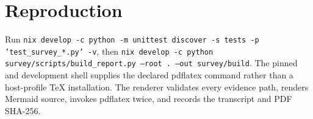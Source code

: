 \documentclass[11pt]{article}
\begin{document}
\section{Reproduction}
Run \texttt{nix develop -c python -m unittest discover -s tests -p 'test\_survey\_*.py' -v}, then \texttt{nix develop -c python survey/scripts/build\_report.py --root . --out survey/build}. The pinned  and  development shell supplies the declared pdflatex command rather than a host-profile TeX installation. The renderer validates every evidence path, renders Mermaid source, invokes pdflatex twice, and records the transcript and PDF SHA-256.
\end{document}
